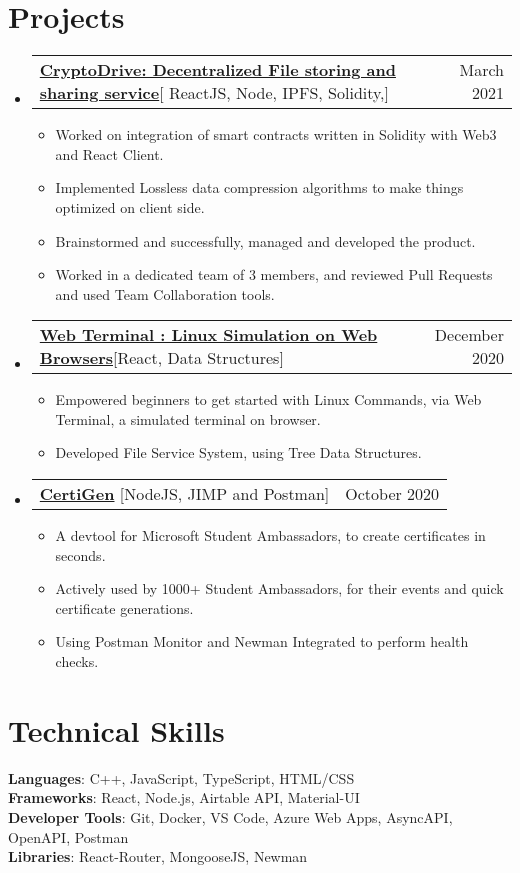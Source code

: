 \documentclass[letterpaper,11pt]{article}
\makeatletter
\newcommand{\resumeItem}[1]{
  \item\small{
    {#1 \vspace{-2pt}}
  }
}
\newcommand{\resumeProjectHeading}[2]{
    \item
    \begin{tabular*}{0.97\textwidth}{l@{\extracolsep{\fill}}r}
      \small#1 & #2 \\
    \end{tabular*}\vspace{-7pt}
}
\newcommand{\resumeSubHeadingListStart}{\begin{itemize}[leftmargin=0.15in, label={}]}
\newcommand{\resumeSubHeadingListEnd}{\end{itemize}}
\newcommand{\resumeItemListStart}{\begin{itemize}}
\newcommand{\resumeItemListEnd}{\end{itemize}\vspace{-5pt}}
\makeatother
\begin{document}
\section{Projects}
    \resumeSubHeadingListStart
      \resumeProjectHeading
          {\textbf{\href{https://www.cryptodrive.tech/}{CryptoDrive: Decentralized File storing and sharing service}}{[ ReactJS, Node, IPFS, Solidity,]}}{March 2021}
          \resumeItemListStart
            \resumeItem{ Worked on integration of smart contracts written in Solidity with Web3 and React Client.}
            \resumeItem{ Implemented Lossless data compression algorithms to make things optimized on client side.}
            \resumeItem{ Brainstormed and successfully, managed and developed the product.}
            \resumeItem{ Worked in a dedicated team of 3 members, and reviewed Pull Requests and used Team Collaboration tools. }
          \resumeItemListEnd
    \resumeSubHeadingListEnd
    
     \resumeSubHeadingListStart
      \resumeProjectHeading
          {\textbf{\href{https://imabp.github.io/WebTerminal/}{Web Terminal : Linux Simulation on Web Browsers}}{[React, Data Structures]}}{December 2020}
          \resumeItemListStart
            \resumeItem{Empowered beginners to get started with Linux Commands, via Web Terminal, a simulated terminal on browser. }
            \resumeItem{Developed File Service System, using Tree Data Structures. }
          \resumeItemListEnd
    \resumeSubHeadingListEnd
  \resumeSubHeadingListStart
      \resumeProjectHeading
          {\textbf{\href{https://github.com/imabp/CertiGen}{\textbf{CertiGen}}}{ [NodeJS, JIMP and Postman]}}{October 2020}
          \resumeItemListStart
            \resumeItem{A devtool for Microsoft Student Ambassadors, to create certificates in seconds. }
            \resumeItem{Actively used by 1000+ Student Ambassadors, for their events and quick certificate generations. }
            \resumeItem{Using Postman Monitor and Newman Integrated to perform health checks.}
          \resumeItemListEnd
    \resumeSubHeadingListEnd


%
\section{Technical Skills}
 \begin{itemize}[leftmargin=0.15in, label={}]
    \small{\item{
     \textbf{Languages}{: C++, JavaScript, TypeScript, HTML/CSS} \\
     \textbf{Frameworks}{: React, Node.js, Airtable API, Material-UI } \\
     \textbf{Developer Tools}{: Git, Docker, VS Code, Azure Web Apps, AsyncAPI, OpenAPI, Postman} \\
     \textbf{Libraries}{: React-Router, MongooseJS, Newman }
    }}
 \end{itemize}
\end{document}
